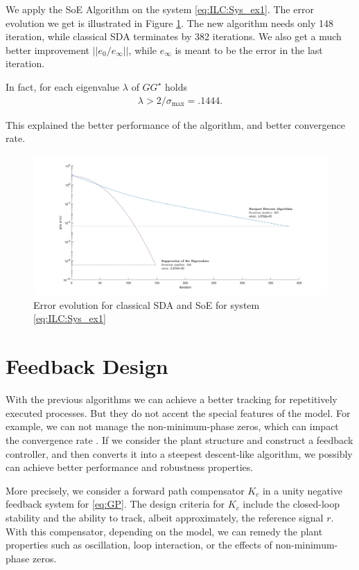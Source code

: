 \begin{exam}
	We apply the SoE Algorithm on the system \eqref{eq:ILC:Sys_ex1}. The error evolution we get is illustrated in Figure \ref{img:ILC:SDAvsSE}. The new algorithm needs only 148 iteration, while classical SDA terminates by 382 iterations. We also get a much better improvement $||e_0/e_\infty||$, while $e_\infty$  is meant to be the error in the last iteration. 
	
	In fact, for each eigenvalue $\lambda$ of $G G^\star$ holds 
	\begin{align}
	\lambda > 2/\sigma_{\max} = .1444. 
	\end{align}
	
	This explained the better performance of the algorithm, and better convergence rate.  		
	\begin{figure}[ht]
		\centering
		\includegraphics[width=\textwidth]{fig/SDAvsSE.jpg}
		\caption{Error evolution for classical SDA and SoE for system \eqref{eq:ILC:Sys_ex1}}
		\label{img:ILC:SDAvsSE}
	\end{figure}
	
\end{exam}

\section{Feedback Design}

With the previous algorithms we can achieve a better tracking for repetitively executed processes.  But they do not accent the special features of the model. For example, we can not manage the non-minimum-phase zeros, which can impact the convergence rate \cite{ILC}. 
If we consider the plant structure and construct a feedback controller, and then converts it into a steepest descent-like algorithm, we possibly can achieve better performance and robustness properties. 

More precisely, we consider a forward path compensator $K_c$ in a unity negative feedback system for \eqref{eq:GP}. 
The design criteria for $K_c$ include the closed-loop stability and the ability to track, albeit approximately, the reference signal $r$. With this compensator, depending on the model, we can remedy the plant properties such as oscillation, loop interaction, or the effects of non-minimum-phase zeros. 


